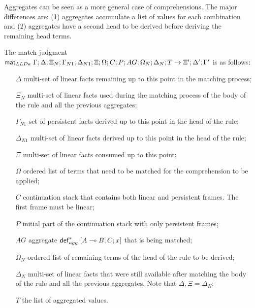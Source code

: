 Aggregates can be seen as a more general case of comprehensions. The major
differences are: (1) aggregates accumulate a list of values for each combination
and (2) aggregates have a second head to be derived before deriving the
remaining head terms.

The match judgment $\mathsf{mat}_{LLDa} \; \Gamma; \Delta; \Xi_N; \Gamma_{N1};
\Delta_{N1}; \Xi; \Omega; C; P; AG; \Omega_N; \Delta_N; T \rightarrow \Xi';
\Delta'; \Gamma'$ is as follows:

\begin{enumerate}

   \item[$\Delta$] multi-set of linear facts remaining up to this point in the
   matching process;

   \item[$\Xi_N$] multi-set of linear facts used during the matching process of
   the body of the rule and all the previous aggregates;

   \item[$\Gamma_{N1}$] set of persistent facts derived up to this point in the
   head of the rule;

   \item[$\Delta_{N1}$] multi-set of linear facts derived up to this point in
   the head of the rule;

   \item[$\Xi$] multi-set of linear facts consumed up to this point;

   \item[$\Omega$] ordered list of terms that need to be matched for the
   comprehension to be applied;

   \item[$C$] continuation stack that contains both linear and persistent
   frames. The first frame must be linear;

   \item[$P$] initial part of the continuation stack with only persistent
   frames;

   \item[$AG$] aggregate $\mathsf{def}_{agg}^{*} \; [A \multimap B ; C; x]$ that is being matched;

   \item[$\Omega_N$] ordered list of remaining terms of the head of the rule to
   be derived;

   \item[$\Delta_N$] multi-set of linear facts that were still available after
   matching the body of the rule and all the previous aggregates. Note that
   $\Delta, \Xi = \Delta_N$;

   \item[$T$] the list of aggregated values.

\end{enumerate}

